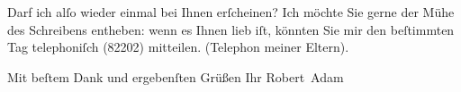 \pstart
           Darf ich alſo wieder einmal bei Ihnen erſcheinen? Ich möchte Sie gerne der Mühe des
               Schreibens entheben: wenn es Ihnen lieb iſt, könnten Sie mir den beſtimmten Tag
               telephoniſch (82202) mitteilen. (Telephon meiner Eltern).\pend
           
\pstart
           Mit beſtem Dank und ergebenſten Grüßen Ihr\pend
           \pstart \spacefill\mbox{Robert Adam}\pend{}\endnumbering{}  \newcommand{\dateiname}{L02287}\newcommand{\titel}{Robert Adam an Arthur Schnitzler, 12. 6. 1918}\newcommand{\editorInnen}{Martin Anton Müller und Gerd-Hermann Susen}
